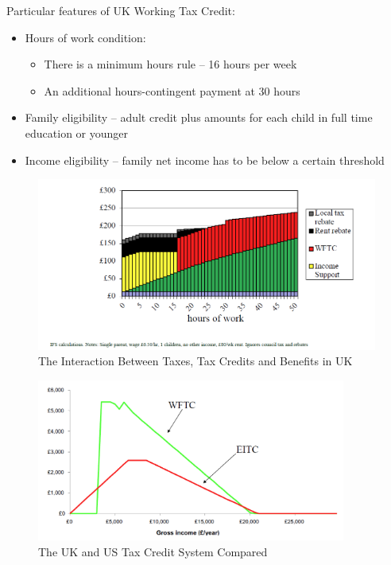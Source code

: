             Particular features of UK Working Tax Credit:
            \begin{itemize}
                \item Hours of work condition:
                \begin{itemize}
                    \item There is a minimum hours rule -- 16 hours per week
                    \item An additional hours-contingent payment at 30 hours    
                \end{itemize}
                \item Family eligibility -- adult credit plus amounts for each child in full time education or younger
                \item Income eligibility -- family net income has to be below a certain threshold
            \end{itemize}

            \begin{figure}[H]
                \centering
                \includegraphics[width=5.5in]{images/ch13/13_UK_Tax_and_trans.png}
                \caption{The Interaction Between Taxes, Tax Credits and Benefits in UK}
            \end{figure}

            \begin{figure}[H]
                \centering
                \includegraphics[width=4in]{images/ch13/13_USUK_credit_compare.png}
                \caption{The UK and US Tax Credit System Compared}
            \end{figure}

